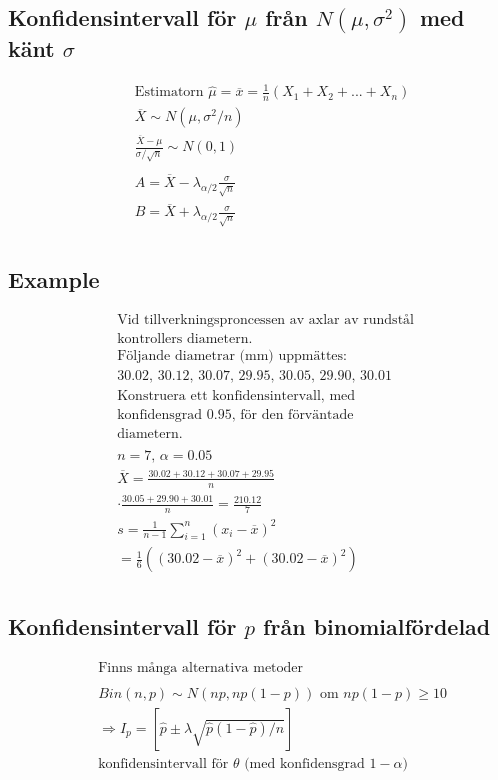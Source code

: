 \begin{multicols}{2}
\subsection{Konfidensintervall för $\mu$ från $N(\mu,\sigma^2)$ med känt $\sigma$}
\begin{align*}
  &\quad  \text{Estimatorn } \hat{\mu}=\overline{x}=\frac{1}{n}(X_1+X_2+...+X_n) \\
  &\quad  \overline{X}\sim{N(\mu,\sigma^2/n)} \\
  &\quad  \frac{\overline{X}-\mu}{\sigma/\sqrt{n}}\sim{N(0,1)} \\
  &\quad  \\
  &\quad  A=\overline{X}-\lambda_{\alpha/2}\frac{\sigma}{\sqrt{n}} \\
  &\quad  B=\overline{X}+\lambda_{\alpha/2}\frac{\sigma}{\sqrt{n}} \\
\end{align*}

\subsection{Example}
\begin{align*}
  &\text{Vid tillverkningsproncessen av axlar av rundstål} \\
  &\text{kontrollers diametern.} \\
  &\text{Följande diametrar (mm) uppmättes:} \\
  &30.02, \, 30.12, \, 30.07, \, 29.95, \, 30.05, \, 29.90, \, 30.01 \\
  &\text{Konstruera ett konfidensintervall, med} \\
  &\text{konfidensgrad $0.95$, för den förväntade} \\
  &\text{diametern.} \\
  &\\
  &n=7, \, \alpha=0.05 \\
  &\overline{X}=\frac{30.02+30.12+30.07+29.95}{n} \\
  &\cdot \frac{30.05+29.90+30.01}{n}=\frac{210.12}{7} \\
  &s=\frac{1}{n-1}\sum_{i=1}^n(x_i-\overline{x})^2 \\
  &= \frac{1}{6}((30.02-\overline{x})^2 + (30.02-\overline{x})^2) \\
\end{align*}

\subsection{Konfidensintervall för $p$ från binomialfördelad}
\begin{align*}
  &\quad  \text{Finns många alternativa metoder}  \\
  &\quad  \\
  &\quad  Bin(n,p)\sim{N(np,np(1-p))} \text{ om } np(1-p)\geq10 \\
  &\quad  \Rightarrow I_p=[\hat{p}\pm\lambda\sqrt{\hat{p}(1-\hat{p})/n}] \\
  &\quad  \text{konfidensintervall för $\theta$ (med konfidensgrad $1-\alpha$)} \\
\end{align*}


\end{multicols}
